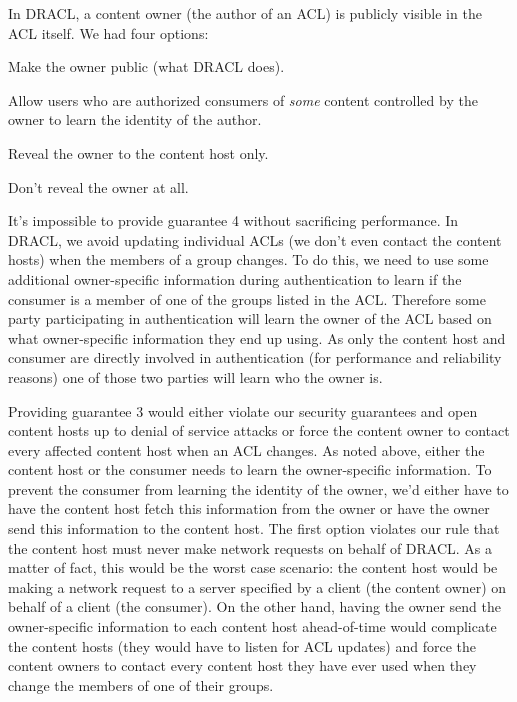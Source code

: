 \documentclass[pdftex,12pt,a4papaer]{report}
\begin{document}
In DRACL, a content owner (the author of an ACL) is publicly visible in the ACL
itself. We had four options:

\begin{compactenum}
\item Make the owner public (what DRACL does).
\item Allow users who are authorized consumers of \emph{some} content controlled
  by the owner to learn the identity of the author.
\item Reveal the owner to the content host only.
\item Don't reveal the owner at all.
\end{compactenum}

It's impossible to provide guarantee 4 without sacrificing performance. In
DRACL, we avoid updating individual ACLs (we don't even contact the content
hosts) when the members of a group changes. To do this, we need to use some
additional owner-specific information during authentication to learn if the
consumer is a member of one of the groups listed in the ACL\@. Therefore some
party participating in authentication will learn the owner of the ACL based on
what owner-specific information they end up using. As only the content host and
consumer are directly involved in authentication (for performance and
reliability reasons) one of those two parties will learn who the owner is.

Providing guarantee 3 would either violate our security guarantees and open
content hosts up to denial of service attacks or force the content owner to
contact every affected content host when an ACL changes. As noted above, either
the content host or the consumer needs to learn the owner-specific information.
To prevent the consumer from learning the identity of the owner, we'd either
have to have the content host fetch this information from the owner or have the
owner send this information to the content host. The first option violates our
rule that the content host must never make network requests on behalf of DRACL\@.
As a matter of fact, this would be the worst case scenario: the content host
would be making a network request to a server specified by a client (the content
owner) on behalf of a client (the consumer). On the other hand, having the owner
send the owner-specific information to each content host ahead-of-time would
complicate the content hosts (they would have to listen for ACL updates) and
force the content owners to contact every content host they have ever used when
they change the members of one of their groups.
\end{document}
